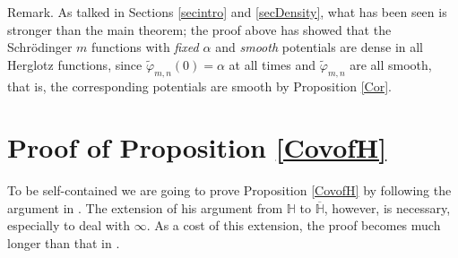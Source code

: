 \documentclass[preprint,12pt]{elsarticle}
\begin{document}
Remark. As talked in Sections \ref{secintro} and \ref{secDensity}, what has been seen is stronger than the main theorem; the proof above has showed that the Schr\"odinger $m$ functions with \textit{fixed $\alpha$} and \textit{smooth} potentials are dense in all Herglotz functions, since $\tilde{\varphi}_{m,n}(0)=\alpha$ at all times and $\tilde{\varphi}_{m,n}$  are all smooth, that is,  the corresponding potentials are smooth by Proposition \ref{Cor}.\\ 

\appendix
\section{Proof of Proposition \ref{CovofH}}
To be self-contained we are going to prove Proposition \ref{CovofH} by following the argument in \cite{Achrt}.  The extension of his argument from $\mathbb H$ to $\overline{\mathbb H}$, however, is necessary, especially to deal with $\infty$. As a cost of this extension, the proof becomes much longer than that in \cite{Achrt}.\\
\end{document}
